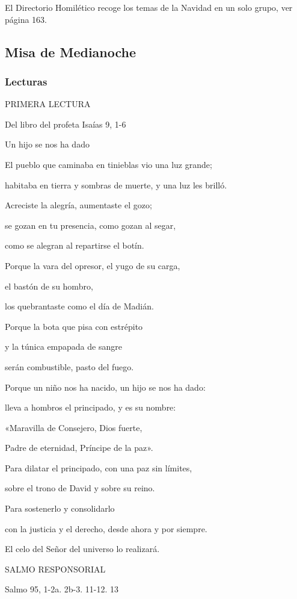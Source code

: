 \documentclass[]{article}
\begin{document}
El Directorio Homilético recoge los temas de la Navidad en un solo
grupo, ver página 163.

\subsection{Misa de Medianoche}\label{misa-de-medianoche}

\subsubsection{Lecturas}\label{lecturas-5}

PRIMERA LECTURA

Del libro del profeta Isaías 9, 1-6

Un hijo se nos ha dado

El pueblo que caminaba en tinieblas vio una luz grande;

habitaba en tierra y sombras de muerte, y una luz les brilló.

Acreciste la alegría, aumentaste el gozo;

se gozan en tu presencia, como gozan al segar,

como se alegran al repartirse el botín.

Porque la vara del opresor, el yugo de su carga,

el bastón de su hombro,

los quebrantaste como el día de Madián.

Porque la bota que pisa con estrépito

y la túnica empapada de sangre

serán combustible, pasto del fuego.

Porque un niño nos ha nacido, un hijo se nos ha dado:

lleva a hombros el principado, y es su nombre:

«Maravilla de Consejero, Dios fuerte,

Padre de eternidad, Príncipe de la paz».

Para dilatar el principado, con una paz sin límites,

sobre el trono de David y sobre su reino.

Para sostenerlo y consolidarlo

con la justicia y el derecho, desde ahora y por siempre.

El celo del Señor del universo lo realizará.

SALMO RESPONSORIAL

Salmo 95, 1-2a. 2b-3. 11-12. 13
\end{document}
